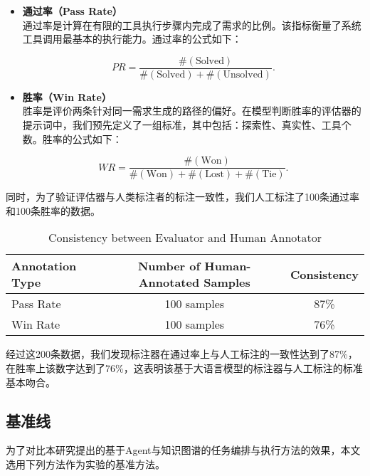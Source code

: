 \begin{itemize}
    \item \textbf{通过率（Pass Rate）} \\
    通过率是计算在有限的工具执行步骤内完成了需求的比例。该指标衡量了系统工具调用最基本的执行能力。通过率的公式如下：

    \begin{equation}
        PR = \frac{ \#(\text{Solved}) }{ \#(\text{Solved}) + \#(\text{Unsolved}) }.
    \end{equation}

    \item \textbf{胜率（Win Rate）} \\
    胜率是评价两条针对同一需求生成的路径的偏好。在模型判断胜率的评估器的提示词中，我们预先定义了一组标准，其中包括：探索性、真实性、工具个数。胜率的公式如下：

    \begin{equation}
        WR = \frac{ \#(\text{Won}) }{ \#(\text{Won}) + \#(\text{Lost}) + \#(\text{Tie}) }.
    \end{equation}

\end{itemize}

同时，为了验证评估器与人类标注者的标注一致性，我们人工标注了100条通过率和100条胜率的数据。

\begin{table}[h]
  \centering
  \caption{Consistency between Evaluator and Human Annotator}
  \begin{tabular}{lcc}
  \hline
  \textbf{Annotation Type} & \textbf{Number of Human-Annotated Samples} & \textbf{Consistency} \\ \hline
  Pass Rate & 100 samples & 87\% \\
  Win Rate & 100 samples & 76\% \\ \hline
  \end{tabular}
  \label{tab:consistency}
  \end{table}
  
  \noindent

经过这200条数据，我们发现标注器在通过率上与人工标注的一致性达到了87\%，在胜率上该数字达到了76\%，这表明该基于大语言模型的标注器与人工标注的标准基本吻合。

\subsection{基准线}

为了对比本研究提出的基于Agent与知识图谱的任务编排与执行方法的效果，本文选用下列方法作为实验的基准方法。

